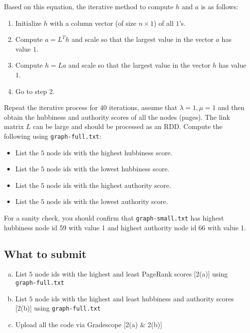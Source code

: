 Based on this equation, the iterative method to compute $h$ and $a$ is as follows:

\begin{enumerate}
  \item Initialize $h$ with a column vector (of size $n \times 1$) of all $1$'s.
  \item Compute $a = L^{T} h$ and scale so that the largest value in the vector $a$ has value $1$.
  \item Compute $h = L a$ and scale so that the largest value in the vector $h$ has value $1$.
  \item Go to step 2.
\end{enumerate}

Repeat the iterative process for $40$ iterations, assume that $\lambda = 1, \mu
= 1$ and then obtain the hubbiness and authority scores of all the nodes
(pages). The link matrix $L$ can be large and should be processed as an RDD\@.
Compute the following using \texttt{graph-full.txt}:

\begin{itemize}
\item List the $5$ node ids with the highest hubbiness score. 
\item List the $5$ node ids with the lowest hubbiness score.
\item List the $5$ node ids with the highest authority score. 
\item List the $5$ node ids with the lowest authority score.
\end{itemize}

For a sanity check, you should confirm that \texttt{graph-small.txt} has
highest hubbiness node id 59 with value 1 and highest authority node id 66
with value 1.


\subsection*{What to submit}
\begin{enumerate}[(a)]
\item List $5$ node ids with the highest and least PageRank scores [2(a)] using \texttt{graph-full.txt}
\item List $5$ node ids with the highest and least hubbiness and authority scores [2(b)] using \texttt{graph-full.txt}
\item Upload all the code via Gradescope [2(a) \& 2(b)]
\end{enumerate}
